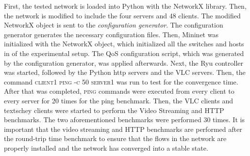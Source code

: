 First, the tested network is loaded into Python with the NetworkX library. Then, the network is modified to include the four servers and 48 clients. The modified NetworkX object is sent to the \textit{configuration generator}. The configuration generator generates the necessary configuration files. Then, Mininet was initialized with the NetworkX object, which initialized all the switches and hosts in of the experimental setup. The QoS configuration script, which was generated by the configuration generator, was applied afterwards. Next, the Ryu controller was started, followed by the Python http servers and the VLC servers. Then, the command \textsc{client1 ping -c 50 server1} was run to test for the convergence time. After that was completed, \textsc{ping} commands were executed from every client to every server for 20 times for the ping benchmark. Then, the VLC clients and textsc{hey} clients were started to perform the Video Streaming and HTTP benchmarks. The two aforementioned benchmarks were performed 30 times. It is important that the video streaming and HTTP benchmarks are performed after the round-trip time benchmark to ensure that the flows in the network are properly installed and the network has converged into a stable state.

